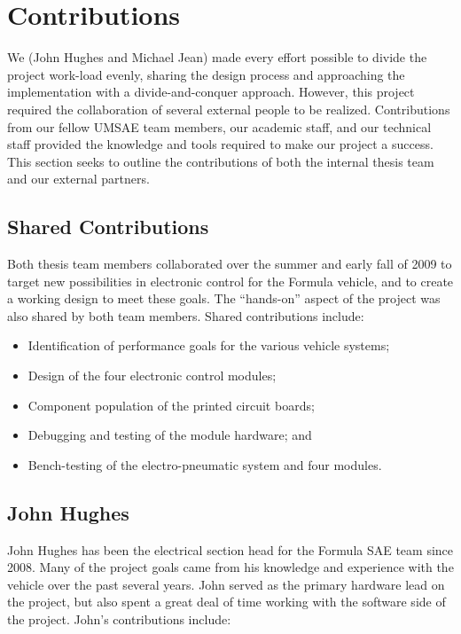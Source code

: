 \chapter*{Contributions}

We (John Hughes and Michael Jean) made every effort possible to divide the project work-load evenly, sharing the design process and approaching the implementation with a divide-and-conquer approach. However, this project required the collaboration of several external people to be realized. Contributions from our fellow UMSAE team members, our academic staff, and our technical staff provided the knowledge and tools required to make our project a success. This section seeks to outline the contributions of both the internal thesis team and our external partners.

\section*{Shared Contributions}

Both thesis team members collaborated over the summer and early fall of 2009 to target new possibilities in electronic control for the Formula vehicle, and to create a working design to meet these goals. The {}``hands-on'' aspect of the project was also shared by both team members. Shared contributions include:

\begin{itemize}

\item Identification of performance goals for the various vehicle systems;
\item Design of the four electronic control modules;
\item Component population of the printed circuit boards;
\item Debugging and testing of the module hardware; and
\item Bench-testing of the electro-pneumatic system and four modules.

\end{itemize}

\section*{John Hughes}

John Hughes has been the electrical section head for the Formula SAE team since 2008. Many of the project goals came from his knowledge and experience with the vehicle over the past several years. John served as the primary hardware lead on the project, but also spent a great deal of time working with the software side of the project. John's contributions include:

